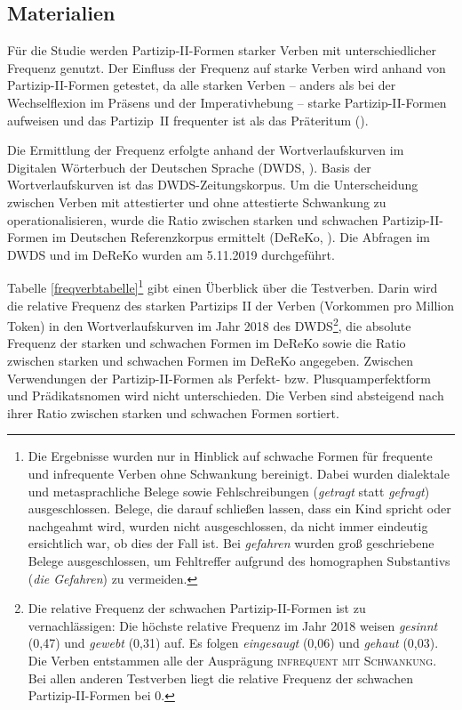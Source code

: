 \subsection{Materialien}
\label{freqmat}

Für die Studie werden Partizip-II-Formen starker Verben mit unterschiedlicher Frequenz genutzt. Der Einfluss der Frequenz auf starke Verben wird anhand von Partizip-II-Formen getestet, da alle starken Verben -- anders als bei der Wechselflexion im Präsens und der Imperativhebung -- starke Partizip-II-Formen aufweisen und das Partizip~II frequenter ist als das Präteritum (\cite[161]{Fischer.2018}). 

\begin{sloppypar}
Die Ermittlung der Frequenz erfolgte anhand der Wortverlaufskurven im Digitalen Wörterbuch der Deutschen Sprache (DWDS, \cite{BerlinBrandenburgischeAkademiederWissenschaften.2019}). Basis der Wortverlaufskurven ist das DWDS-Zei\-tungs\-kor\-pus. Um die Unterscheidung zwischen Verben mit attestierter und ohne attestierte Schwankung zu operationalisieren, wurde die Ratio zwischen starken und schwachen Partizip-II-Formen im Deutschen Referenzkorpus ermittelt (DeReKo, \cite{LeibnizInstitutfurDeutscheSprache.2019}). Die Abfragen im DWDS und im DeReKo wurden am 5.11.2019 durchgeführt. 
\end{sloppypar}

Tabelle \ref{freqverbtabelle}\footnote{Die Ergebnisse wurden nur in Hinblick auf schwache Formen für frequente und infrequente Verben ohne Schwankung bereinigt. Dabei wurden dialektale und metasprachliche Belege sowie Fehlschreibungen (\textit{getragt} statt \textit{gefragt}) ausgeschlossen. Belege, die darauf schließen lassen, dass ein Kind spricht oder nachgeahmt wird, wurden nicht ausgeschlossen, da nicht immer eindeutig ersichtlich war, ob dies der Fall ist. Bei \textit{gefahren} wurden groß geschriebene Belege ausgeschlossen, um Fehltreffer aufgrund des homographen Substantivs (\textit{die Gefahren}) zu vermeiden.} gibt einen Überblick über die Testverben. Darin wird die relative Frequenz des starken Partizips II der Verben (Vorkommen pro Million Token) in den Wortverlaufskurven im Jahr 2018 des DWDS\footnote{Die relative Frequenz der schwachen Partizip-II-Formen ist zu vernachlässigen: Die höchste relative Frequenz im Jahr 2018 weisen \textit{gesinnt} (0,47) und \textit{gewebt} (0,31) auf. Es folgen \textit{eingesaugt} (0,06) und \textit{gehaut} (0,03). Die Verben entstammen alle der Ausprägung \textsc{infrequent mit Schwankung}. Bei allen anderen Testverben liegt die relative Frequenz der schwachen Partizip-II-Formen bei 0.}, die absolute Frequenz der starken und schwachen Formen im DeReKo sowie die Ratio zwischen starken und schwachen Formen im DeReKo angegeben. Zwischen Verwendungen der Partizip-II-Formen als Perfekt- bzw. Plusquamperfektform und Prädikatsnomen wird nicht unterschieden. Die Verben sind absteigend nach ihrer Ratio zwischen starken und schwachen Formen sortiert. 

